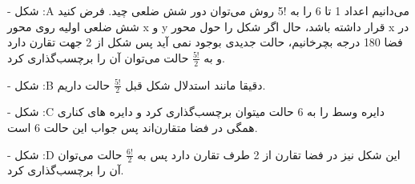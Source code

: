 -
شکل
:A
\p
می‌دانیم اعداد 1 تا 6 را به !5 روش می‌توان دور شش ضلعی چید. فرض کنید شش ضلعی اولیه روی محور x و y قرار داشته باشد، حال اگر شکل را حول محور x در فضا 180 درجه بچرخانیم، حالت جدیدی بوجود نمی آید پس شکل از 2 جهت تقارن دارد و به
$\frac{5!}{2}$
حالت می‌توان آن را برچسب‌گذاری کرد.

-
شکل
:B
\p
دقیقا مانند استدلال شکل قبل
$\frac{5!}{2}$
حالت داریم.

-
شکل
:C
\p
دایره وسط را به 6 حالت میتوان برچسب‌گذاری کرد و دایره های کناری همگی در فضا متقارن‌اند پس جواب این حالت 6 است.

-
شکل 
:D
\p
این شکل نیز در فضا تقارن از 2 طرف تقارن دارد پس به 
$\frac{6!}{2}$
حالت می‌توان آن را برچسب‌گذاری کرد.	